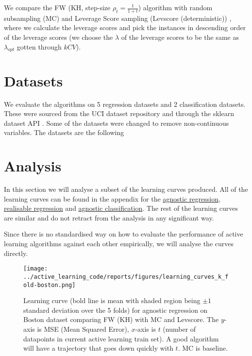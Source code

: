 We compare the FW (KH, step-size \(\rho_t = \frac{1}{1+t}\)) algorithm with
random subsampling (MC) and Leverage Score sampling (Levscore (deterministic)) \cite{rudi18}, where we
calculate the leverage scores and pick the instances in descending order of the
leverage scores (we choose the \(\lambda\) of the leverage scores to be the same
as \(\lambda_{opt}\) gotten through \(kCV\)).

\section{Datasets}

We evaluate the algorithms on 5 regression datasets and 2 classification
datasets. These were sourced from the UCI dataset repository \cite{dua17_uci_machin_learn_repos} and through the
sklearn dataset API \cite{dua17_uci_machin_learn_repos}. Some of the datasets
were changed to remove non-continuous variables. The datasets are the following

\section{Analysis}

In this section we will analyse a subset of the learning curves produced. All of
the learning curves can be found in the appendix for the
\hyperref[figs:agnostic-regression-learning-curves]{agnostic regression},
\hyperref[figs:realisable-regression-learning-curves]{realisable regression} and
\hyperref[figs:agnostic-classification-learning-curves]{agnostic
  classification}. The rest of the learning curves are similar and do not retract
from the analysis in any significant way.

Since there is no standardised way on how to evaluate the performance of active
learning algorithms against each other empirically, we will analyse the curves
directly.

\begin{figure}[h] \centering
  \label{fig:learning-curve-boston-agnostic-experiments}
  \texttt{[image: ../active\_learning\_code/reports/figures/learning\_curves\_k\_fold-boston.png]}
  \caption{Learning curve (bold line is mean with shaded region being \(\pm 1\)
    standard deviation over the 5 folds) for agnostic regression on Boston dataset
    comparing FW (KH) with MC and Levscore. The \(y\)-axis is MSE (Mean Squared
    Error), \(x\)-axis is \(t\) (number of datapoints in current active learning
    train set). A good algorithm will have a trajectory that goes down quickly with
    \(t\). MC is baseline.}
  \label{fig:mesh1}
\end{figure}

